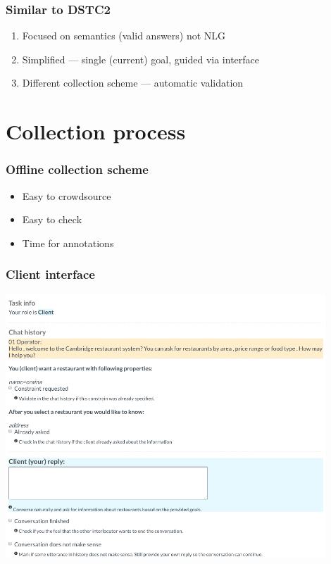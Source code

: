 \documentclass[10pt, compress,british,xcolor={svgnames,dvipsnames,x11names},trans]{beamer}
\begin{document}
\begin{frame}\frametitle{Similar to DSTC2\cite{henderson2014dstc2}}
    \begin{enumerate}
        \item Focused on semantics (valid answers) not NLG
        \item Simplified --- single (current) goal, guided via interface  
        \item Different collection scheme --- automatic validation
    \end{enumerate}
\end{frame}


\section{Collection process}

\begin{frame}\frametitle{Offline collection scheme}
    \begin{itemize}
        \item Easy to crowdsource
        \item Easy to check 
        \item Time for annotations\cite{wen2016network}
    \end{itemize}
\end{frame}

\begin{frame}\frametitle{Client interface}
    \includegraphics[width=0.90\textwidth]{./gui-annotators-client.png}
\end{frame}
\end{document}
